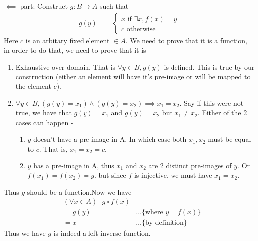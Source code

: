 \documentclass[xcolor=svgnames]{beamer}
\begin{document}
\begin{frame}{}
\footnotesize{
    $\impliedby$ part:
    Construct $g:B \rightarrow A$ such that - 
    \begin{align*}
    g(y) &= 
        \begin{cases}
        x \text{ if $\exists x, f(x) = y$}
        \\ c \text{ otherwise}
        \end{cases}
    \end{align*}
    Here $c$ is an arbitary fixed element $\in A$. 
    We need to prove that it is a function, in order to do that, we need to prove that it is 
    \begin{enumerate}
        \item Exhaustive over domain. That is $\forall y \in B, g(y)$ is defined. This is true by our construction (either an element will have it's pre-image or will be mapped to the element $c$).
        \item $\forall y \in B, (g(y) = x_1) \land (g(y) = x_2) \implies x_1 = x_2$. Say if this were not true, we have that $g(y) = x_1$ and $g(y) = x_2$ but $x_1 \neq x_2$. Either of the 2 cases can happen - 
        \begin{enumerate}
            \item $y$ doesn't have a pre-image in A. In which case both $x_1,x_2$ must be equal to $c$. That is, $x_1 = x_2 = c$.
            \item $y$ has a pre-image in A, thus $x_1$ and $x_2$ are 2 distinct pre-images of $y$. Or $f(x_1) = f(x_2) = y$. but since $f$ is injective, we must have $x_1 = x_2$.
        \end{enumerate}
    \end{enumerate}
    Thus $g$ should be a function.Now we have 
    \begin{align*}
        & (\forall x \in A) \text{ } g \circ f(x) 
        \\ &= g(y) & \ldots \text{\{where $y = f(x)$\}}
        \\ &= x & \ldots \text{\{ by definition\}}
    \end{align*}
    Thus we have $g$ is indeed a left-inverse function.
}
\end{frame}
\end{document}
